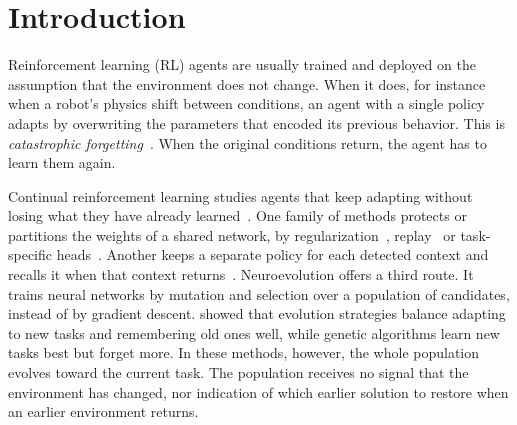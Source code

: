 \section{Introduction}

Reinforcement learning (RL) agents are usually trained and deployed on the assumption that the environment does not change. When it does, for instance when a robot's physics shift between conditions, an agent with a single policy adapts by overwriting the parameters that encoded its previous behavior. This is \textit{catastrophic forgetting}~\citep{mccloskey1989catastrophic}. When the original conditions return, the agent has to learn them again.

Continual reinforcement learning studies agents that keep adapting without losing what they have already learned~\citep{khetarpal2022towards}. One family of methods protects or partitions the weights of a shared network, by regularization~\citep{kirkpatrick2017overcoming}, replay~\citep{rolnick2019experience} or task-specific heads~\citep{kessler2022same}. Another keeps a separate policy for each detected context and recalls it when that context returns~\citep{dasilva2006dealing,alegre2021minimum,dick2024statistical}. Neuroevolution offers a third route. It trains neural networks by mutation and selection over a population of candidates, instead of by gradient descent. \citet{nisioti2026continual} showed that evolution strategies balance adapting to new tasks and remembering old ones well, while genetic algorithms learn new tasks best but forget more. In these methods, however, the whole population evolves toward the current task. The population receives no signal that the environment has changed, nor indication of which earlier solution to restore when an earlier environment returns.

